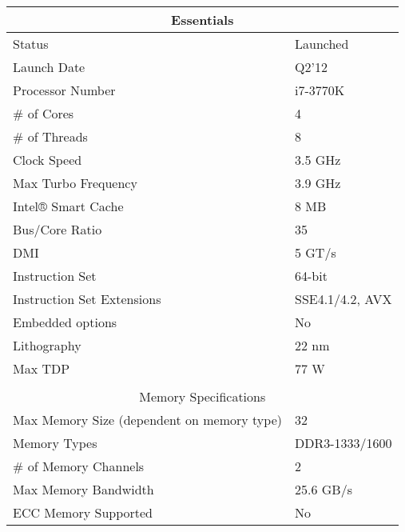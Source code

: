 \begin{table}[H]
  \begin{tabular}{ll}
  \hline
  \multicolumn{2}{|c|}{Essentials} \\ \hline
  \multicolumn{1}{|l|}{Status} & \multicolumn{1}{l|}{Launched} \\ \hline
  \multicolumn{1}{|l|}{Launch Date} & \multicolumn{1}{l|}{Q2'12} \\ \hline
  \multicolumn{1}{|l|}{Processor Number} & \multicolumn{1}{l|}{i7-3770K} \\ \hline
  \multicolumn{1}{|l|}{\# of Cores} & \multicolumn{1}{l|}{4} \\ \hline
  \multicolumn{1}{|l|}{\# of Threads} & \multicolumn{1}{l|}{8} \\ \hline
  \multicolumn{1}{|l|}{Clock Speed} & \multicolumn{1}{l|}{3.5 GHz} \\ \hline
  \multicolumn{1}{|l|}{Max Turbo Frequency} & \multicolumn{1}{l|}{3.9 GHz} \\ \hline
  \multicolumn{1}{|l|}{Intel® Smart Cache} & \multicolumn{1}{l|}{8 MB} \\ \hline
  \multicolumn{1}{|l|}{Bus/Core Ratio} & \multicolumn{1}{l|}{35} \\ \hline
  \multicolumn{1}{|l|}{DMI} & \multicolumn{1}{l|}{5 GT/s} \\ \hline
  \multicolumn{1}{|l|}{Instruction Set} & \multicolumn{1}{l|}{64-bit} \\ \hline
  \multicolumn{1}{|l|}{Instruction Set Extensions} & \multicolumn{1}{l|}{SSE4.1/4.2, AVX} \\ \hline
  \multicolumn{1}{|l|}{Embedded options} & \multicolumn{1}{l|}{No} \\ \hline
  \multicolumn{1}{|l|}{Lithography} & \multicolumn{1}{l|}{22 nm} \\ \hline
  \multicolumn{1}{|l|}{Max TDP} & \multicolumn{1}{l|}{77 W} \\ \hline
   &  \\ \hline
  \multicolumn{2}{|c|}{Memory Specifications} \\ \hline
  \multicolumn{1}{|l|}{Max Memory Size (dependent on memory type)} & \multicolumn{1}{l|}{32} \\ \hline
  \multicolumn{1}{|l|}{Memory Types} & \multicolumn{1}{l|}{DDR3-1333/1600} \\ \hline
  \multicolumn{1}{|l|}{\# of Memory Channels} & \multicolumn{1}{l|}{2} \\ \hline
  \multicolumn{1}{|l|}{Max Memory Bandwidth} & \multicolumn{1}{l|}{25.6 GB/s} \\ \hline
  \multicolumn{1}{|l|}{ECC Memory Supported} & \multicolumn{1}{l|}{No} \\ \hline
  \end{tabular}
\end{table}

